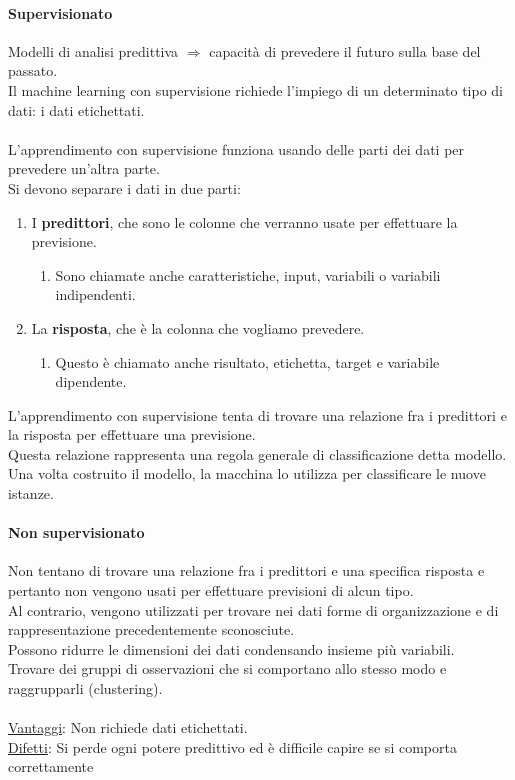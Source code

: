 \documentclass[../main.tex]{subfiles}
\begin{document}
	\paragraph{Supervisionato} 
	Modelli di analisi predittiva $\Rightarrow$ capacità di prevedere il futuro sulla base del passato. \\
	Il machine learning con supervisione richiede l'impiego di un determinato tipo di dati: i dati etichettati.\\\\
	L'apprendimento con supervisione funziona usando delle parti dei dati per prevedere un’altra parte. \\
	Si devono separare i dati in due parti:
	\begin{enumerate}
		\item I \textbf{predittori}, che sono le colonne che verranno usate per effettuare la previsione. 
		\begin{enumerate}
			\item Sono chiamate anche caratteristiche, input, variabili o variabili indipendenti.
		\end{enumerate}
		\item La \textbf{risposta}, che è la colonna che vogliamo prevedere. 
		\begin{enumerate}
			\item Questo è chiamato anche risultato, etichetta, target e variabile dipendente.
		\end{enumerate}
	\end{enumerate}
	L'apprendimento con supervisione tenta di trovare una relazione fra i predittori e la risposta per effettuare una previsione. \\
	Questa relazione rappresenta una regola generale di classificazione detta modello. \\
	Una volta costruito il modello, la macchina lo utilizza per classificare le nuove istanze.
	\paragraph{Non supervisionato} 
	Non tentano di trovare una relazione fra i predittori e una specifica risposta e pertanto non vengono usati per effettuare previsioni di alcun tipo. \\
	Al contrario, vengono utilizzati per trovare nei dati forme di organizzazione e di rappresentazione precedentemente sconosciute. \\
	Possono ridurre le dimensioni dei dati condensando insieme più variabili. \\
	Trovare dei gruppi di osservazioni che si comportano allo stesso modo e raggrupparli (clustering).\\\\
	\underline{Vantaggi}: Non richiede dati etichettati. \\
	\underline{Difetti}: Si perde ogni potere predittivo ed è difficile capire se si comporta correttamente
\end{document}
